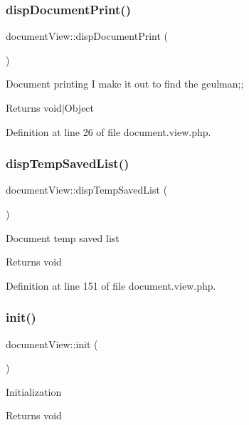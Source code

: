 \subsubsection{\texorpdfstring{disp\+Document\+Print()}{dispDocumentPrint()}}
{\footnotesize\ttfamily document\+View\+::disp\+Document\+Print (\begin{DoxyParamCaption}{ }\end{DoxyParamCaption})}

Document printing I make it out to find the geulman;; \begin{DoxyReturn}{Returns}
void$\vert$\+Object 
\end{DoxyReturn}


Definition at line 26 of file document.\+view.\+php.

\hypertarget{classdocumentView_a849d0bdc714a0ea2fd23bbe86f2fde6f}{}\label{classdocumentView_a849d0bdc714a0ea2fd23bbe86f2fde6f} 
\subsubsection{\texorpdfstring{disp\+Temp\+Saved\+List()}{dispTempSavedList()}}
{\footnotesize\ttfamily document\+View\+::disp\+Temp\+Saved\+List (\begin{DoxyParamCaption}{ }\end{DoxyParamCaption})}

Document temp saved list \begin{DoxyReturn}{Returns}
void 
\end{DoxyReturn}


Definition at line 151 of file document.\+view.\+php.

\hypertarget{classdocumentView_a198da8ed86ff84d45687f2783113b799}{}\label{classdocumentView_a198da8ed86ff84d45687f2783113b799} 
\subsubsection{\texorpdfstring{init()}{init()}}
{\footnotesize\ttfamily document\+View\+::init (\begin{DoxyParamCaption}{ }\end{DoxyParamCaption})}

Initialization \begin{DoxyReturn}{Returns}
void 
\end{DoxyReturn}


